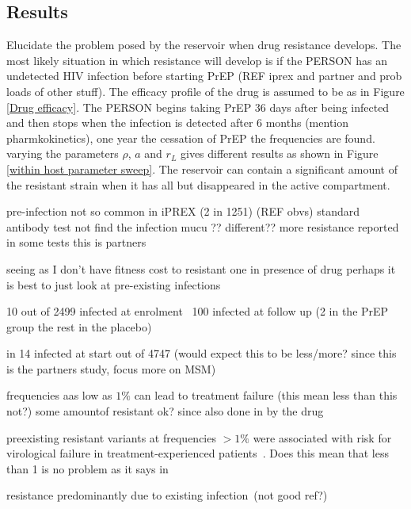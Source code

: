 \documentclass[DIV=15]{scrartcl}
\begin{document}



\subsection{Results}
Elucidate the problem posed by the reservoir when drug resistance develops. The  most likely situation in which resistance will develop is  if  the PERSON has an undetected HIV infection before starting PrEP (REF iprex and partner and prob loads of  other stuff). The efficacy profile of the drug is assumed to be as in Figure \ref{Drug efficacy}. The PERSON begins taking PrEP $36$ days after being infected and then stops when the infection is detected after $6$ months (mention pharmkokinetics), one year the cessation  of PrEP the frequencies are found. varying the parameters $\rho$, $a$ and $r_L$ 
gives different results as shown in Figure \ref{within host parameter sweep}. The reservoir can contain a significant amount of the resistant strain when it has all   but disappeared in the active compartment.





pre-infection not so common in iPREX (2 in 1251) (REF obvs) standard antibody test not find the infection 
mucu  ?? different??
more resistance reported in some tests \cite{lehman2015} this is partners 

seeing as I don't have fitness cost to resistant one in presence of drug perhaps it is best to just look at pre-existing infections

10 out of 2499 infected at enrolment~\cite{iprex2011}
100 infected at follow up (2 in the PrEP group the rest in the placebo)

in \cite{partners2012} 14 infected at start out of 4747 (would expect this to be less/more? since this is the partners study, focus more on MSM)

frequencies aas low as $1\%$ can lead to treatment failure (this mean less than this not?) some amountof resistant ok? since also done in by the drug

preexisting resistant
variants at frequencies $>1\%$ were associated with risk for virological
failure in treatment-experienced patients~\cite{boltz2011}. Does this mean that less than 1 is no problem as it says in~\cite{lehman2015}

resistance predominantly due to existing infection~\cite{lehman2015}(not good ref?)
\end{document}
